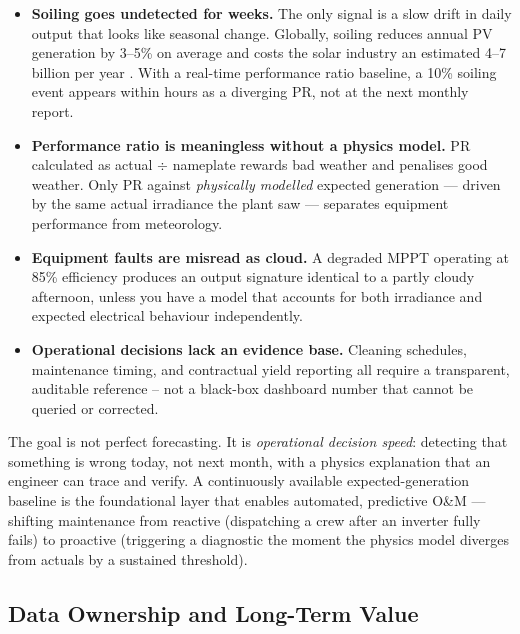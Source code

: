 \documentclass[11pt, a4paper]{article}
\begin{document}
\begin{itemize}
  \item \textbf{Soiling goes undetected for weeks.} The only signal is a
    slow drift in daily output that looks like seasonal change. Globally,
    soiling reduces annual PV generation by 3--5\% on average and costs the
    solar industry an estimated \EUR{}4--7 billion per year \cite{skoplaki2009performance}.
    With a real-time performance ratio baseline, a 10\% soiling event appears
    within hours as a diverging PR, not at the next monthly report.
  \item \textbf{Performance ratio is meaningless without a physics model.}
    PR calculated as actual $\div$ nameplate rewards bad weather and penalises
    good weather. Only PR against \emph{physically modelled} expected
    generation --- driven by the same actual irradiance the plant saw ---
    separates equipment performance from meteorology.
  \item \textbf{Equipment faults are misread as cloud.} A degraded MPPT
    operating at 85\% efficiency produces an output signature identical to
    a partly cloudy afternoon, unless you have a model that accounts for
    both irradiance and expected electrical behaviour independently.
  \item \textbf{Operational decisions lack an evidence base.} Cleaning
    schedules, maintenance timing, and contractual yield reporting all require
    a transparent, auditable reference -- not a black-box dashboard number
    that cannot be queried or corrected.
\end{itemize}

\begin{insightbox}
The goal is not perfect forecasting. It is \emph{operational decision speed}:
detecting that something is wrong today, not next month, with a physics
explanation that an engineer can trace and verify. A continuously available
expected-generation baseline is the foundational layer that enables automated,
predictive O\&M --- shifting maintenance from reactive (dispatching a crew
after an inverter fully fails) to proactive (triggering a diagnostic the
moment the physics model diverges from actuals by a sustained threshold).
\end{insightbox}

\subsection{Data Ownership and Long-Term Value}
\end{document}
